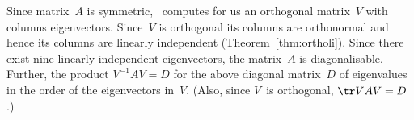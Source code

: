 \begin{example}
\begin{solution}
Since matrix~\(A\) is symmetric, \script\ computes for us an orthogonal matrix~\(V\) with columns eigenvectors.
Since~\(V\) is orthogonal its columns are orthonormal and hence its columns are linearly independent (Theorem~\ref{thm:ortholi}).
Since there exist nine linearly independent eigenvectors, the matrix~\(A\) is diagonalisable.
Further, the product \(V^{-1}AV=D\) for the above diagonal matrix~\(D\) of eigenvalues in the order of the eigenvectors in~\(V\).
(Also, since \(V\)~is orthogonal, \(\tr VAV=D\).)
\end{solution}
\end{example}





